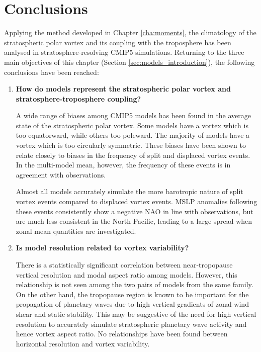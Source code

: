 \section{Conclusions}

Applying the method developed in Chapter \ref{cha:moments}, the climatology of
the stratospheric polar vortex and its coupling with the troposphere has been
analysed in stratosphere-resolving CMIP5 simulations. Returning to the three
main objectives of this chapter (Section \ref{sec:models_introduction}), the
following conclusions have been reached:
\begin{enumerate}

\item \textbf{How do models represent the stratospheric polar vortex and
    stratosphere-troposphere coupling?}

  A wide range of biases among CMIP5 models has been found in the average state
  of the stratospheric polar vortex. Some models have a vortex which is too
  equatorward, while others too poleward. The majority of models have a vortex
  which is too circularly symmetric. These biases have been shown to relate
  closely to biases in the frequency of split and displaced vortex events. In
  the multi-model mean, however, the frequency of these events is in agreement
  with observations. 

  Almost all models accurately simulate the more barotropic nature of split
  vortex events compared to displaced vortex events. MSLP anomalies following
  these events consistently show a negative NAO in line with observations, but
  are much less consistent in the North Pacific, leading to a large spread when
  zonal mean quantities are investigated.

\item \textbf{Is model resolution related to vortex variability?}

  There is a statistically significant correlation between near-tropopause
  vertical resolution and modal aspect ratio among models. However, this
  relationship is not seen among the two pairs of models from the same
  family. On the other hand, the tropopause region is known to be important for
  the propagation of planetary waves due to high vertical gradients of zonal
  wind shear and static stability. This may be suggestive of the need for high
  vertical resolution to accurately simulate stratospheric planetary wave
  activity and hence vortex aspect ratio. No relationships have been found
  between horizontal resolution and vortex variability.


\end{enumerate}
